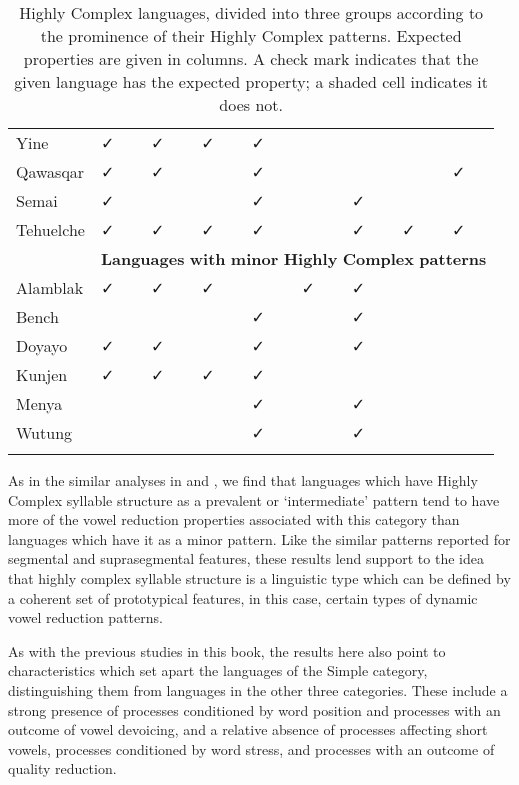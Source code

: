 \begin{table}
\begin{tabularx}{\textwidth}{XXXXXXXXX}
\hhline{~--------}
 Yine & ✓ & ✓ & ✓ & ✓ &  &  &  & \\
\hhline{~--------}
 Qawasqar & ✓ & ✓ &  & ✓ &  &  &  & ✓\\
\hhline{~--------}
 Semai & ✓ &  &  & ✓ &  & ✓ &  & \\
\hhline{~--------}
 Tehuelche & ✓ & ✓ & ✓ & ✓ &  & ✓ & ✓ & ✓\\
& \multicolumn{8}{c}{ \textbf{Languages} \textbf{with} \textbf{minor} \textbf{Highly} \textbf{Complex} \textbf{patterns}}\\
\hhline{~--------}
 Alamblak & ✓ & ✓ & ✓ &  & ✓ & ✓ &  & \\
\hhline{~--------}
 Bench &  &  &  & ✓ &  & ✓ &  & \\
\hhline{~--------}
 Doyayo & ✓ & ✓ &  & ✓ &  & ✓ &  & \\
\hhline{~--------}
 Kunjen & { ✓} & ✓ & ✓ & ✓ &  &  &  & \\
\hhline{~--------}
 Menya &  &  &  & ✓ &  & ✓ &  & \\
\hhline{~--------}
 Wutung &  &  &  & ✓ &  & ✓ &  & \\
\lspbottomrule
\end{tabularx}
\caption{\label{6.11}Highly Complex languages, divided into three groups according to the prominence of their Highly Complex patterns. Expected properties are given in columns. A check mark indicates that the given language has the expected property; a shaded cell indicates it does not.}
\end{table}

  As in the similar analyses in  and , we find that languages which have Highly Complex syllable structure as a prevalent or ‘intermediate’ pattern tend to have more of the vowel reduction properties associated with this category than languages which have it as a minor pattern. Like the similar patterns reported for segmental and suprasegmental features, these results lend support to the idea that highly complex syllable structure is a linguistic type which can be defined by a coherent set of prototypical features, in this case, certain types of dynamic vowel reduction patterns.

  As with the previous studies in this book, the results here also point to characteristics which set apart the languages of the Simple category, distinguishing them from languages in the other three categories. These include a strong presence of processes conditioned by word position and processes with an outcome of vowel devoicing, and a relative absence of processes affecting short vowels, processes conditioned by word stress, and processes with an outcome of quality reduction.

